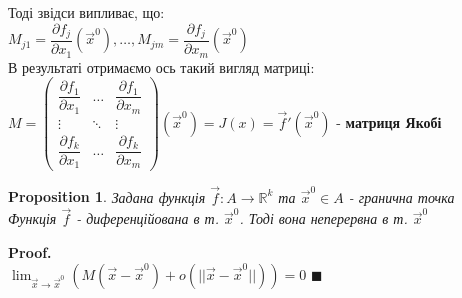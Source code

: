 \documentclass[a4paper, 14pt]{extarticle}
\def\huge{\displaystyle}
\def\bigline{\vspace{5mm}\\}
\theoremstyle{theoremdd}
\theoremstyle{theoremdd}
\theoremstyle{theoremdd}
\newtheorem{proposition}[theorem]{Proposition}
\theoremstyle{theoremdd}
\theoremstyle{theoremdd}
\theoremstyle{theoremdd}
\theoremstyle{theoremdd}
\newenvironment{pf}{\vspace*{-3mm} \textbf{Proof. \\}}{$\blacksquare$}
\begin{document}
Тоді звідси випливає, що:\\
$M_{j1} = \dfrac{\partial f_j}{\partial x_1} (\vec{x}^0), \dots, M_{jm} = \dfrac{\partial f_j}{\partial x_m} (\vec{x}^0)$\\
В результаті отримаємо ось такий вигляд матриці:\\
$M = \begin{pmatrix}
\dfrac{\partial f_1}{\partial x_1} & \dots & \dfrac{\partial f_1}{\partial x_m} \\
\vdots & \ddots & \vdots \\
\dfrac{\partial f_k}{\partial x_1} & \dots & \dfrac{\partial f_k}{\partial x_m}
\end{pmatrix}(\vec{x}^0) = J(x) = \vec{f}'(\vec{x}^0)$ - \textbf{матриця Якобі}
\bigline
\begin{proposition}
Задана функція $\vec{f}: A \to \mathbb{R}^k$ та $\vec{x}^0 \in A$ - гранична точка\\
Функція $\vec{f}$ - диференційована в т. $\vec{x}^0$. Тоді вона неперервна в т. $\vec{x}^0$
\end{proposition}
\begin{pf}
$\huge \lim_{\vec{x} \to \vec{x}^0} \left(M(\vec{x}- \vec{x}^0) + o(||\vec{x} - \vec{x}^0||) \right) = 0$
\end{pf}
\\
\end{document}
